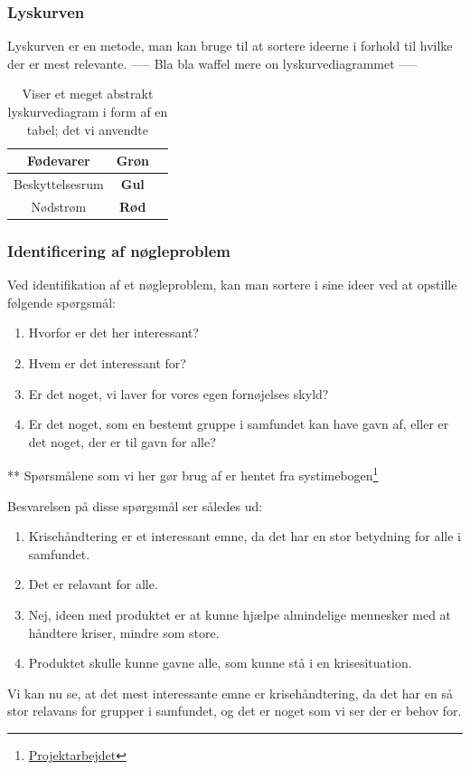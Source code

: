 \subsubsection{Lyskurven}
Lyskurven er en metode, man kan bruge til at sortere ideerne i forhold til hvilke der er mest relevante.
----- Bla bla waffel mere on lyskurvediagrammet -----

\begin{table}[H]
    \centering
    \begin{tabular}{|c|c|c|}
        \hline
        Fødevarer & \textbf{Grøn} \\
        \hline
        Beskyttelsesrum & \textbf{Gul} \\
        \hline
        Nødstrøm & \textbf{Rød} \\
        \hline
    \end{tabular}
    \caption{Viser et meget abstrakt lyskurvediagram i form af en tabel; det vi anvendte}
\end{table}

\subsubsection{Identificering af nøgleproblem}
Ved identifikation af et nøgleproblem, kan man sortere i sine ideer ved at opstille følgende spørgsmål:
\begin{enumerate}
    \item Hvorfor er det her interessant?
    \item Hvem er det interessant for?
    \item Er det noget, vi laver for vores egen fornøjelses skyld?
    \item Er det noget, som en bestemt gruppe i samfundet kan have gavn af, eller er det noget, der er til gavn for alle?
\end{enumerate}
** Spørsmålene som vi her gør brug af er hentet fra systimebogen\footnote{\href{https://projektarbejdet.systime.dk/?id=271}{Projektarbejdet}}

Besvarelsen på disse spørgsmål ser således ud:
\begin{enumerate}
    \item Krisehåndtering er et interessant emne, da det har en stor betydning for alle i samfundet.
    \item Det er relavant for alle.
    \item Nej, ideen med produktet er at kunne hjælpe almindelige mennesker med at håndtere kriser, mindre som store.
    \item Produktet skulle kunne gavne alle, som kunne stå i en krisesituation.
\end{enumerate}

Vi kan nu se, at det mest interessante emne er krisehåndtering, da det har en så stor relavans for grupper i samfundet, og det er noget som vi ser der er behov for.